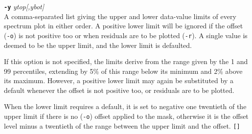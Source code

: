 \documentclass[twoside,11pt,nolof]{starlink}
\begin{document}
{{{       \sstitem
       {\bf{\tt{-y}}} \emph{ytop[,ybot]}\\
          A comma-separated list giving the upper and lower data-value limits
          of every spectrum plot in either order.  A positive lower limit
          will be ignored if the offset (\texttt{-o}) is not positive too or when
          residuals are to be plotted (\texttt{-r}).  A single value is deemed to
          be the upper limit, and the lower limit is defaulted.

          If this option is not specified, the limits derive from the
          range given by the 1 and 99 percentiles, extending by 5\% of this
          range below its minimum and 2\% above its maximum.  However, a
          positive lower limit may again be substituted by a default
          whenever the offset is not positive too, or residuals are
          to be plotted.

          When the lower limit requires a default, it is set to negative
          one twentieth of the upper limit if there is no (\texttt{-o}) offset
          applied to the mask, otherwise it is the offset level minus a
          twentieth of the range between the upper limit and the offset.
          \texttt{[]}
      }
   }
   \label{trendview_notes}
   \sstnotes{
      \ssthitemlist{

}}}
\end{document}
